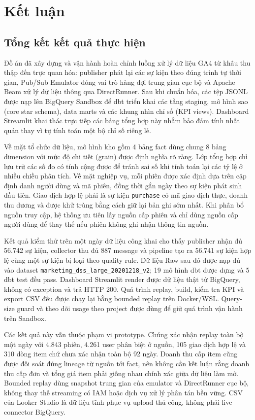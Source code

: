 \section{Kết luận}
\label{sec:ketluan}

\subsection{Tổng kết kết quả thực hiện}
\label{sec:summary}

Đồ án đã xây dựng và vận hành hoàn chỉnh luồng xử lý dữ liệu GA4 từ khâu thu thập đến trực quan hóa: publisher phát lại các sự kiện theo đúng trình tự thời gian, Pub/Sub Emulator đóng vai trò hàng đợi trung gian cục bộ và Apache Beam xử lý dữ liệu thông qua DirectRunner. Sau khi chuẩn hóa, các tệp JSONL được nạp lên BigQuery Sandbox để dbt triển khai các tầng staging, mô hình sao (core star schema), data marts và các khung nhìn chỉ số (KPI views). Dashboard Streamlit khai thác trực tiếp các bảng tổng hợp này nhằm bảo đảm tính nhất quán thay vì tự tính toán một bộ chỉ số riêng lẻ.\medskip

Về mặt tổ chức dữ liệu, mô hình kho gồm 4 bảng fact dùng chung 8 bảng dimension với mức độ chi tiết (grain) được định nghĩa rõ ràng. Lớp tổng hợp chỉ lưu trữ các số đo có tính cộng được để tránh sai số khi tính toán lại các tỷ lệ ở nhiều chiều phân tích. Về mặt nghiệp vụ, mỗi phiên được xác định dựa trên cặp định danh người dùng và mã phiên, đồng thời gắn ngày theo sự kiện phát sinh đầu tiên. Giao dịch hợp lệ phải là sự kiện \texttt{purchase} có mã giao dịch thực, doanh thu dương và được khử trùng bằng cách giữ lại bản ghi sớm nhất. Khi phân bổ nguồn truy cập, hệ thống ưu tiên lấy nguồn cấp phiên và chỉ dùng nguồn cấp người dùng để thay thế nếu phiên không ghi nhận thông tin nguồn.\medskip

Kết quả kiểm thử trên một ngày dữ liệu công khai cho thấy publisher nhận đủ 56.742 sự kiện, collector thu đủ 887 message và pipeline tạo ra 56.741 sự kiện hợp lệ cùng một sự kiện bị loại theo quality rule. Dữ liệu Raw sau đó được nạp đủ vào dataset \texttt{marketing\_dss\_large\_20201218\_v2}; 19 mô hình dbt được dựng và 5 dbt test đều pass. Dashboard Streamlit render được dữ liệu thật từ BigQuery, không có exception và trả HTTP 200. Quá trình replay, build, kiểm tra KPI và export CSV đều được chạy lại bằng bounded replay trên Docker/WSL. Query-size guard và theo dõi usage theo project được dùng để giữ quá trình vận hành trên Sandbox.\medskip

Các kết quả này vẫn thuộc phạm vi prototype. Chúng xác nhận replay toàn bộ một ngày với 4.843 phiên, 4.261 user phân biệt ở nguồn, 105 giao dịch hợp lệ và 310 dòng item chứ chưa xác nhận toàn bộ 92 ngày. Doanh thu cấp item cũng được đối soát đúng lineage từ nguồn tới fact, nên không cần kết luận rằng doanh thu cấp đơn và tổng giá item phải giống nhau chính xác giữa dữ liệu làm mờ. Bounded replay dùng snapshot trung gian của emulator và DirectRunner cục bộ, không thay thế streaming có IAM hoặc dịch vụ xử lý phân tán bền vững. CSV của Looker Studio là dữ liệu tĩnh phục vụ upload thủ công, không phải live connector BigQuery.\medskip

